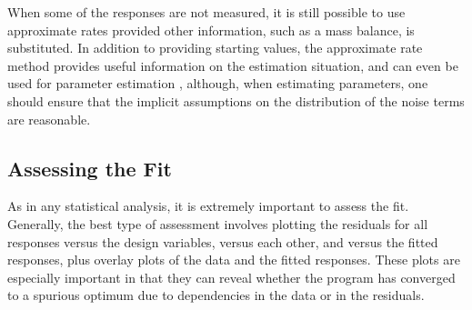 When some of the responses are not measured, it is still possible
to use approximate rates provided other information, such as a
mass balance, is substituted.
In addition to providing starting values, the approximate rate
method provides useful information on the estimation situation,
and can even be used for parameter estimation \cite{vara:1982},
although, when estimating parameters, one should ensure that the
implicit assumptions on the distribution of the noise terms are
reasonable.

\subsection{Assessing the Fit}

As in any statistical analysis, it is extremely important to
assess the fit.
Generally, the best type of assessment involves plotting the
residuals for all responses versus the design variables, versus
each other, and versus the fitted responses, plus overlay plots
of the data and the fitted responses.
These plots are especially important in that they can reveal
whether the program has converged to a spurious optimum due to
dependencies in the data or in the residuals.

